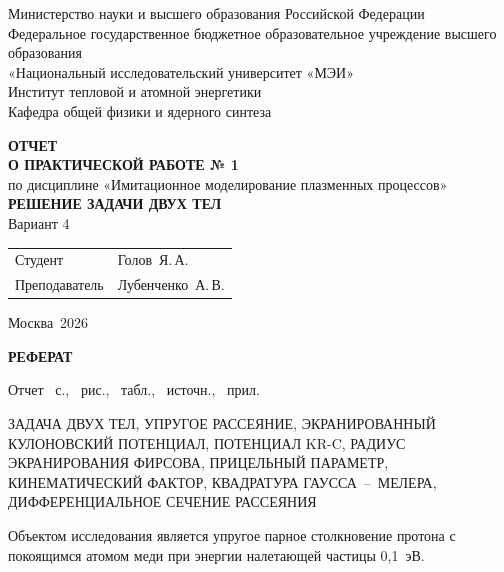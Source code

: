 \documentclass[a4paper,14pt]{extarticle}
\newcommand{\Ministry}{Министерство науки и высшего образования Российской Федерации}
\newcommand{\Organization}{Федеральное государственное бюджетное образовательное
  учреждение высшего образования\\
  «Национальный исследовательский университет «МЭИ»}
\newcommand{\Institute}{Институт тепловой и атомной энергетики}
\newcommand{\Department}{Кафедра общей физики и ядерного синтеза}
\newcommand{\Discipline}{Имитационное моделирование плазменных процессов}
\newcommand{\StudentName}{Голов~Я.\,А.}
\newcommand{\TeacherName}{Лубенченко~А.\,В.}
\newcommand{\City}{Москва}
\newcommand{\Year}{2026}
\begin{document}
\begin{titlepage}
  \begin{center}
    \Ministry\\[6pt]
    \Organization\\[12pt]
    \Institute\\[6pt]
    \Department
  \end{center}

  \vfill

  \begin{center}
    {\bfseries ОТЧЕТ\\
    О ПРАКТИЧЕСКОЙ РАБОТЕ № 1}\\[12pt]
    по дисциплине «\Discipline»\\[24pt]
    {\bfseries РЕШЕНИЕ ЗАДАЧИ ДВУХ ТЕЛ}\\[12pt]
    Вариант 4
  \end{center}

  \vfill

  \noindent
  \begin{tabular}{@{}p{7.5cm}>{\raggedleft\arraybackslash}p{7.5cm}@{}}
    Студент       & \StudentName \\[12pt]
    Преподаватель & \TeacherName \\
  \end{tabular}

  \vfill

  \begin{center}
    \City\ \Year
  \end{center}
\end{titlepage}
\setcounter{page}{2}

\clearpage
{\centering\bfseries РЕФЕРАТ\par}\vspace{18pt}

Отчет \pageref{LastPage}~с., ~рис., ~табл.,
~источн., ~прил.

ЗАДАЧА ДВУХ ТЕЛ, УПРУГОЕ РАССЕЯНИЕ, ЭКРАНИРОВАННЫЙ КУЛОНОВСКИЙ ПОТЕНЦИАЛ,
ПОТЕНЦИАЛ KR-C, РАДИУС ЭКРАНИРОВАНИЯ ФИРСОВА, ПРИЦЕЛЬНЫЙ ПАРАМЕТР,
КИНЕМАТИЧЕСКИЙ ФАКТОР, КВАДРАТУРА ГАУССА~--~МЕЛЕРА, ДИФФЕРЕНЦИАЛЬНОЕ СЕЧЕНИЕ
РАССЕЯНИЯ

Объектом исследования является упругое парное столкновение протона
с покоящимся атомом меди при энергии налетающей частицы 0,1~эВ.
\end{document}
